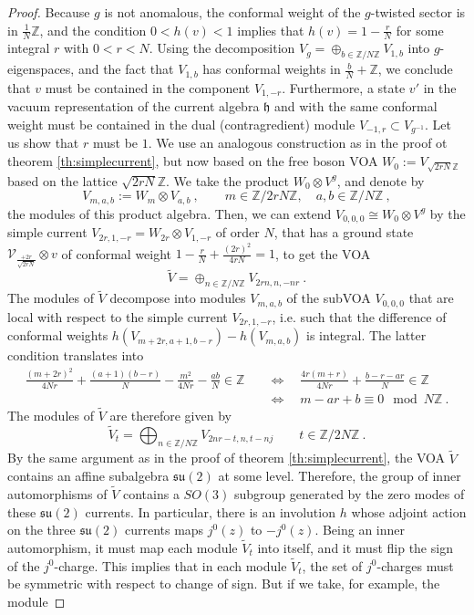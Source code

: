 \documentclass[10pt,a4paper]{amsart}
\newcommand{\CV}{\mathcal{V}}
\newcommand{\ZZ}{\mathbb{Z}}
\newcommand{\alg}[1]{\mathfrak{#1}}
\newcommand{\be}{\begin{equation}}
\newcommand{\ee}{\end{equation}}
\begin{document}
\begin{proof}
Because $g$ is not anomalous, the conformal weight of the $g$-twisted sector is in $\frac{1}{N}\ZZ$, and the condition $0<h(v)<1$ implies that $h(v)=1-\frac{r}{N}$ for some integral $r$ with $0<r<N$. Using the decomposition $V_g=\oplus_{b\in \ZZ/N\ZZ} V_{1,b}$ into $g$-eigenspaces, and the fact that $V_{1,b}$ has conformal weights in $\frac{b}{N}+\ZZ$, we conclude that $v$ must be contained in the component $V_{1,-r}$. Furthermore, a state $v'$ in the vacuum representation of the current algebra $\alg{h}$ and with the same conformal weight must be contained in the dual (contragredient) module $V_{-1,r}\subset V_{g^{-1}}$. Let us show that $r$ must be $1$. We  use an analogous construction as in the proof ot theorem \ref{th:simplecurrent}, but now based on the free boson VOA $W_0:=V_{\sqrt{2rN}\ZZ}$ based on the lattice $\sqrt{2rN}\ZZ$. We take the product $W_0\otimes V^g$, and denote by
\be V_{m,a,b}:=W_m\otimes V_{a,b}\ ,\qquad m\in \ZZ/2rN\ZZ,\quad a,b\in \ZZ/N\ZZ\ ,
\ee the modules of this product algebra. Then, we can extend $V_{0,0,0}\cong W_0\otimes V^g$ by the simple current $V_{2r,1,-r}=W_{2r}\otimes V_{1,-r}$ of order $N$, that has a ground state $\CV_{\frac{+2r}{\sqrt{2rN}}}\otimes v$ of conformal weight $1-\frac{r}{N}+\frac{(2r)^2}{4rN}=1$, to get the VOA
\be \tilde V=\oplus_{n\in \ZZ/N\ZZ} V_{2rn, n,-nr}\ .
\ee The modules of $\tilde V$ decompose into modules $V_{m,a,b}$ of the subVOA $V_{0,0,0}$ that are local with respect to the simple current $V_{2r,1,-r}$, i.e. such that the difference of conformal weights $h(V_{m+2r,a+1,b-r})-h(V_{m,a,b})$ is integral. The latter condition translates into
\begin{align} \frac{(m+2r)^2}{4Nr}+\frac{(a+1)(b-r)}{N}- \frac{m^2}{4Nr}-\frac{ab}{N}\in \ZZ \quad &\Leftrightarrow \quad \frac{4r(m+r)}{4Nr}+\frac{b-r-ar}{N}\in \ZZ  \\ &\Leftrightarrow \quad  m-ar+b\equiv 0\mod N\ZZ\ .
\end{align} The modules of $\tilde V$ are therefore given by
\be \tilde V_t=\bigoplus_{n\in \ZZ/N\ZZ} V_{2nr-t,n,t-nj}\qquad t\in \ZZ/2N\ZZ\ .
\ee By the same argument as in the proof of theorem \ref{th:simplecurrent}, the VOA $\tilde V$ contains an affine subalgebra $\alg{su}(2)$ at some level. Therefore, the group of inner automorphisms of $\tilde V$ contains a $SO(3)$ subgroup generated by the zero modes of these $\alg{su}(2)$ currents. In particular, there is an involution $h$ whose adjoint action on the three $\alg{su}(2)$ currents  maps $j^0(z)$ to $-j^0(z)$. Being an inner automorphism, it must map each module $\tilde V_t$ into itself, and it must flip the sign of the $j^0$-charge. This implies that in each module $\tilde V_t$, the set of $j^0$-charges must be symmetric with respect to change of sign. But if we take, for example, the module

\end{proof}
\end{document}
